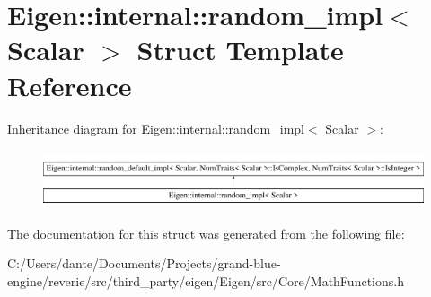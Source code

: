 \hypertarget{struct_eigen_1_1internal_1_1random__impl}{}\section{Eigen\+::internal\+::random\+\_\+impl$<$ Scalar $>$ Struct Template Reference}
\label{struct_eigen_1_1internal_1_1random__impl}
Inheritance diagram for Eigen\+::internal\+::random\+\_\+impl$<$ Scalar $>$\+:\begin{figure}[H]
\begin{center}
\leavevmode
\includegraphics[height=1.717791cm]{struct_eigen_1_1internal_1_1random__impl}
\end{center}
\end{figure}


The documentation for this struct was generated from the following file\+:\begin{DoxyCompactItemize}
\item 
C\+:/\+Users/dante/\+Documents/\+Projects/grand-\/blue-\/engine/reverie/src/third\+\_\+party/eigen/\+Eigen/src/\+Core/Math\+Functions.\+h\end{DoxyCompactItemize}
